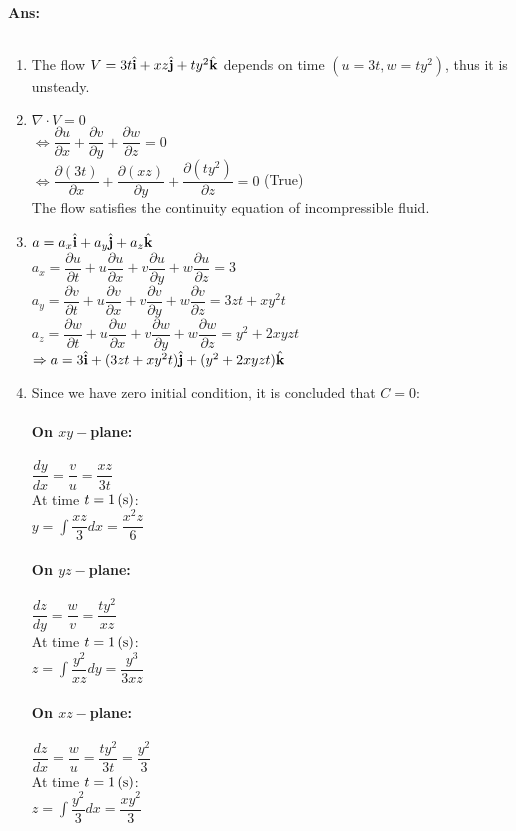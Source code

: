 \paragraph{Ans:}$  $\\
\begin{enumerate}
	\item The flow $ V = 3t\hat{\mathbf{i}} + xz\hat{\mathbf{j}} + ty^2\hat{\mathbf{k}} $ depends on time $( u=3t, w=ty^2) $, thus it is unsteady.
	\item $ \nabla \cdot V=0 $\\
	$\Leftrightarrow \dfrac{\partial u}{\partial x} + \dfrac{\partial v}{\partial y} + \dfrac{\partial w}{\partial z}=0$\\
	$ \Leftrightarrow \dfrac{\partial (3t)}{\partial x} + \dfrac{\partial (xz)}{\partial y} + \dfrac{\partial (ty^2)}{\partial z} =0$ (True)\\
	The flow satisfies the continuity equation of incompressible fluid.
	\item $ a=a_x\hat{\mathbf{i}}+a_y\hat{\mathbf{j}}+a_z\hat{\mathbf{k}} $\\
	$ a_x =  \dfrac{\partial u}{\partial t} +u \dfrac{\partial u}{\partial x} + v \dfrac{\partial u}{\partial y} + w \dfrac{\partial u}{\partial z} = 3$\\
	$ a_y =  \dfrac{\partial v}{\partial t} +u \dfrac{\partial v}{\partial x} + v \dfrac{\partial v}{\partial y} + w \dfrac{\partial v}{\partial z} = 3zt + xy^2t$\\
	$ a_z =  \dfrac{\partial w}{\partial t} +u \dfrac{\partial w}{\partial x} + v \dfrac{\partial w}{\partial y} + w \dfrac{\partial w}{\partial z} = y^2 + 2xyzt$\\
	$ \Rightarrow a = 3\hat{\mathbf{i}} + (3zt+xy^2t)\hat{\mathbf{j}} + (y^2 + 2xyzt)\hat{\mathbf{k}} $
	\item Since we have zero initial condition, it is concluded that $ C=0 $:
	\paragraph{On $ xy- $plane:}
	$ \dfrac{dy}{dx} = \dfrac{v}{u} = \dfrac{xz}{3t}$\\
	At time $ t=1\, (\mathrm{s}) $:\\
	$\displaystyle y=\int\dfrac{xz}{3}dx = \dfrac{x^2z}{6} $
	\paragraph{On $ yz- $plane:}
	$ \dfrac{dz}{dy} = \dfrac{w}{v} = \dfrac{ty^2}{xz}$\\
	At time $ t=1\, (\mathrm{s}) $:\\
	$\displaystyle z=\int\dfrac{y^2}{xz}dy = \dfrac{y^3}{3xz} $
	\paragraph{On $ xz- $plane:}
	$ \dfrac{dz}{dx} = \dfrac{w}{u} = \dfrac{ty^2}{3t}=\dfrac{y^2}{3}$\\
	At time $ t=1\, (\mathrm{s}) $:\\
	$\displaystyle z=\int\dfrac{y^2}{3}dx = \dfrac{xy^2}{3} $
\end{enumerate}

